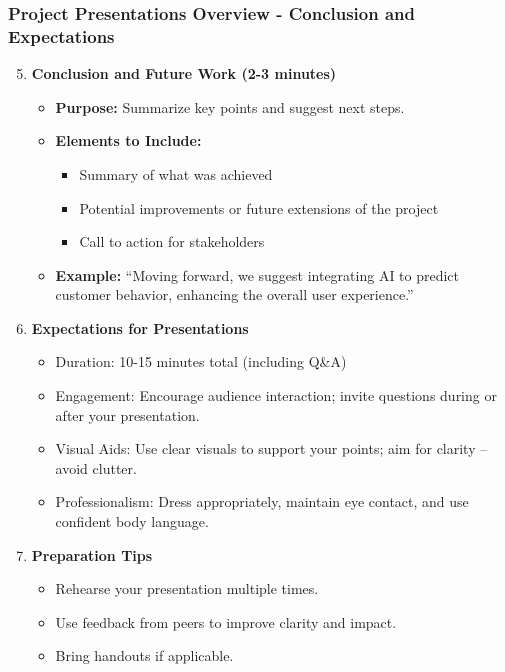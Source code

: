 \documentclass{beamer}
\begin{document}
\begin{frame}[fragile]
    \frametitle{Project Presentations Overview - Conclusion and Expectations}
    \begin{enumerate}
        \setcounter{enumi}{4}
        \item \textbf{Conclusion and Future Work (2-3 minutes)}
        \begin{itemize}
            \item \textbf{Purpose:} Summarize key points and suggest next steps.
            \item \textbf{Elements to Include:}
            \begin{itemize}
                \item Summary of what was achieved
                \item Potential improvements or future extensions of the project
                \item Call to action for stakeholders
            \end{itemize}
            \item \textbf{Example:} ``Moving forward, we suggest integrating AI to predict customer behavior, enhancing the overall user experience.”
        \end{itemize}

        \item \textbf{Expectations for Presentations}
        \begin{itemize}
            \item Duration: 10-15 minutes total (including Q\&A)
            \item Engagement: Encourage audience interaction; invite questions during or after your presentation.
            \item Visual Aids: Use clear visuals to support your points; aim for clarity – avoid clutter.
            \item Professionalism: Dress appropriately, maintain eye contact, and use confident body language.
        \end{itemize}

        \item \textbf{Preparation Tips}
        \begin{itemize}
            \item Rehearse your presentation multiple times.
            \item Use feedback from peers to improve clarity and impact.
            \item Bring handouts if applicable.
        \end{itemize}
    \end{enumerate}         
\end{frame}
\end{document}

